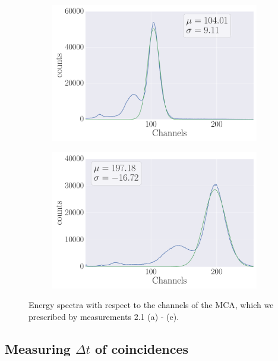 \begin{figure}
\begin{subfigure}[b]{\picwidth}
        \caption{}
    \end{subfigure}
    \begin{subfigure}[b]{\picwidth}
        \includegraphics[width=\textwidth]{analysis/figures/plot2_1d}
        \caption{}
    \end{subfigure}
    \begin{subfigure}[b]{\picwidth}
        \includegraphics[width=\textwidth]{analysis/figures/plot2_1e}
        \caption{}
    \end{subfigure}
    \caption{Energy spectra with respect to the channels of the MCA, which we prescribed by
        measurements 2.1 (a) - (e).}
    \label{fig:measure2.1}
\end{figure}
\clearpage
\subsection{Measuring $\Delta t$ of coincidences}
\label{sub:measuring_delayed_coincidences}
